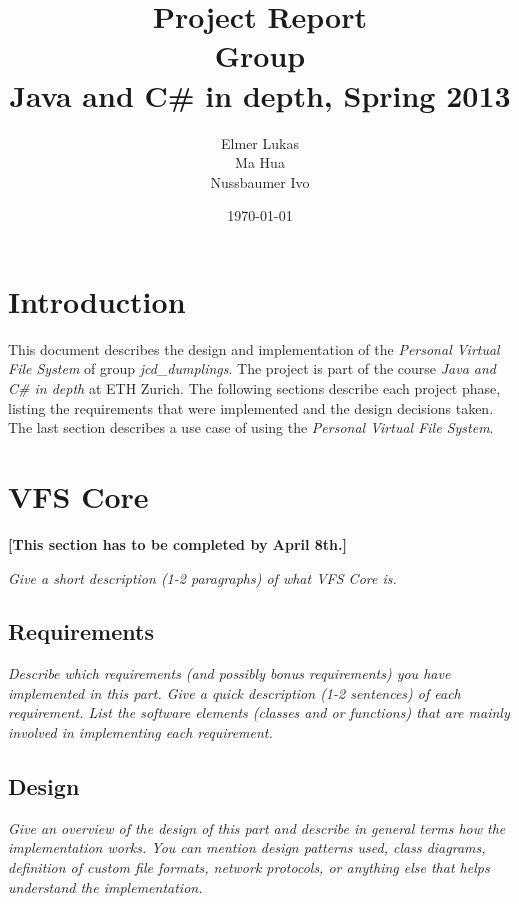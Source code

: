 \documentclass[a4paper,12pt]{article}
\title{
Project Report \\ 
Group \groupname \\
\vspace{5mm}
\large Java and C\# in depth, Spring 2013
}
\author{
Elmer Lukas \\
Ma Hua \\
Nussbaumer Ivo
}
\date{\today}
\newcommand{\groupname}{jcd\_dumplings\xspace}
\begin{document}
\maketitle

\section{Introduction}

This document describes the design and implementation of the \emph{Personal Virtual File System} of group \emph{\groupname}. The project is part of the course \emph{Java and C\# in depth} at ETH Zurich. The following sections describe each project phase, listing the requirements that were implemented and the design decisions taken. The last section describes a use case of using the \emph{Personal Virtual File System}.


\section{VFS Core}

\textbf{[This section has to be completed by April 8th.]}

\emph{Give a short description (1-2 paragraphs) of what VFS Core is.}


\subsection{Requirements}

\emph{Describe which requirements (and possibly bonus requirements) you have implemented in this part. Give a quick description (1-2 sentences) of each requirement. List the software elements (classes and or functions) that are mainly involved in implementing each requirement.}


\subsection{Design}

\emph{Give an overview of the design of this part and describe in general terms how the implementation works. You can mention design patterns used, class diagrams, definition of custom file formats, network protocols, or anything else that helps understand the implementation.}
\end{document}
